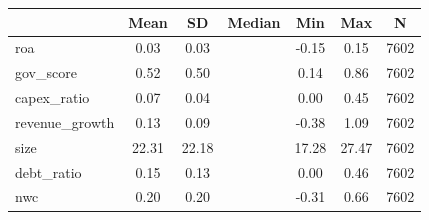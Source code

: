 {
\def\sym#1{\ifmmode^{#1}\else\(^{#1}\)\fi}
\begin{tabular}{l*{1}{cccccc}}
\toprule
                    &        Mean&          SD&      Median&         Min&         Max&           N\\
\midrule
roa                 &        0.03&        0.03&            &       -0.15&        0.15&        7602\\
gov\_score           &        0.52&        0.50&            &        0.14&        0.86&        7602\\
capex\_ratio         &        0.07&        0.04&            &        0.00&        0.45&        7602\\
revenue\_growth      &        0.13&        0.09&            &       -0.38&        1.09&        7602\\
size                &       22.31&       22.18&            &       17.28&       27.47&        7602\\
debt\_ratio          &        0.15&        0.13&            &        0.00&        0.46&        7602\\
nwc                 &        0.20&        0.20&            &       -0.31&        0.66&        7602\\
\bottomrule
\end{tabular}
}
